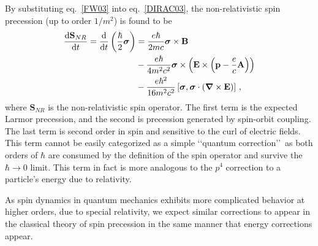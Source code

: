 By substituting eq.~\eqref{FW03} into eq.~\eqref{DIRAC03}, the non-relativistic spin precession (up to order $1/m^{2}$) is found to be
\begin{alignat}{1}
  \notag\frac{\mathrm{d}\mathbf{S}_{NR}}{\mathrm{d}t}=\frac{\mathrm{d}}{\mathrm{d}t}\left(\frac{\hbar}{2}\boldsymbol{\sigma}\right)&=\frac{e\hbar}{2mc}\boldsymbol{\sigma}\times\mathbf{B}\\
  \notag&-\frac{e\hbar}{4m^{2}c^{2}}\boldsymbol{\sigma}\times\left(\mathbf{E}\times\left(\mathbf{p}-\frac{e}{c}\mathbf{A}\right)\right)\\
  \label{SPIN01}&-\frac{e\hbar^{2}}{16m^{2}c^{2}}\left[\boldsymbol{\sigma},\boldsymbol{\sigma}\cdot\left(\boldsymbol{\nabla}\times\mathbf{E}\right)\right]\,,
\end{alignat}
where $\mathbf{S}_{NR}$ is the non-relativistic spin operator. The first term is the expected Larmor precession, and the second is precession generated by spin-orbit coupling. The last term is second order in spin and sensitive to the curl of electric fields. This term cannot be easily categorized as a simple \lq\lq quantum correction\rq\rq\, as both orders of $\hbar$ are consumed by the definition of the spin operator and survive the $\hbar\rightarrow 0$ limit. This term in fact is more analogous to the $p^{4}$ correction to a particle's energy due to relativity.

As spin dynamics in quantum mechanics exhibits more complicated behavior at higher orders, due to special relativity, we expect similar corrections to appear in the classical theory of spin precession in the same manner that energy corrections appear.

